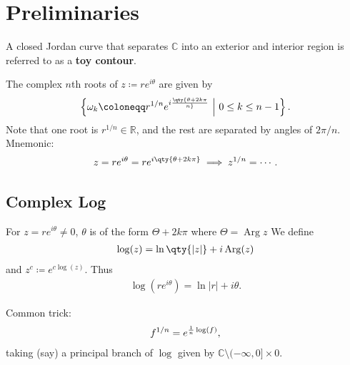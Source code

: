 \hypertarget{preliminaries}{%
\section{Preliminaries}\label{preliminaries}}

\begin{definition}

A closed Jordan curve that separates \({\mathbb{C}}\) into an exterior
and interior region is referred to as a \textbf{toy contour}.

\end{definition}

\begin{fact}

The complex \(n\)th roots of \(z \coloneqq r e^{i\theta}\) are given by
\begin{align*}
\left\{{ \omega_k \coloneqq r^{1/n} e^{i \qty{ \theta + 2k\pi \over n} } {~\mathrel{\Big|}~}0 \leq k \leq n-1 }\right\}
.\end{align*}
Note that one root is \(r^{1/n}\in {\mathbb{R}}\), and the rest are
separated by angles of \(2\pi/n\). Mnemonic:
\begin{align*}
z = re^{i\theta} = re^{i\qty{\theta + 2k\pi}} \implies z^{1/n} = \cdots
.\end{align*}

\end{fact}

\hypertarget{complex-log}{%
\subsection{Complex Log}\label{complex-log}}

\begin{fact}

For \(z= r e^{i\theta}\neq 0\), \(\theta\) is of the form
\(\Theta + 2k\pi\) where \(\Theta = \operatorname{Arg}z\) We define
\begin{align*}
\log(z) = \ln\qty{{\left\lvert {z} \right\rvert}} + i\operatorname{Arg}(z)
\end{align*}
and \(z^c \coloneqq e^{c\log(z)}\). Thus
\begin{align*}
\log(re^{i\theta}) = \ln {\left\lvert {r} \right\rvert} + i\theta
.\end{align*}

\end{fact}

\begin{fact}

Common trick:
\begin{align*}
f^{1/n} = e^{{1\over n} \log(f)}
,\end{align*}
taking (say) a principal branch of \(\log\) given by
\({\mathbb{C}}\setminus(-\infty, 0] \times 0\).

\end{fact}

